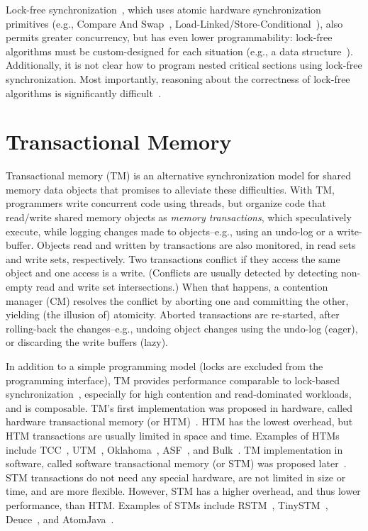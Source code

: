 \documentclass[12pt,english]{report}
\begin{document}
Lock-free synchronization~\cite{herlihy2008art}, 
which uses atomic hardware synchronization primitives (e.g., Compare And Swap~\cite{CAS64IA32, CASitanium}, Load-Linked/Store-Conditional~\cite{LL:CS:Sites:1993:AAA:151220.151226}),
also permits greater concurrency, but has even lower programmability: lock-free algorithms must be custom-designed for each situation (e.g., a data structure~\cite{lockfreeLLmichael2002high,lockfreeSL,lockfreeBSTfraser2004practical,HopscotchHashing,KarySearchTreesbrown2011non}). Additionally, it is not clear how to program nested critical sections using lock-free synchronization. Most importantly, reasoning about the correctness of lock-free algorithms is significantly difficult~\cite{herlihy2008art}. 

\section{Transactional Memory}

Transactional memory (TM) is an alternative synchronization model for shared memory data objects that promises to alleviate these difficulties.  With TM, programmers write concurrent code using threads, but organize code that read/write shared memory objects as \emph{memory transactions}, which speculatively execute, while logging changes made to objects--e.g., using an undo-log or a write-buffer. Objects read and written by transactions are also monitored, in read sets and write sets, respectively. Two transactions conflict if they access the same object and one access is a write. (Conflicts are usually detected by detecting non-empty read and write set intersections.) When that happens, a contention manager (CM) resolves the conflict by aborting one and committing the other, yielding (the illusion of) atomicity. Aborted transactions are re-started, after rolling-back the changes--e.g., undoing object changes using the undo-log (eager), or discarding the write buffers (lazy). 

In addition to a simple programming model (locks are excluded from the programming interface), TM provides performance comparable to lock-based synchronization~\cite{Saha:2006:MHP:1122971.1123001}, especially for high contention and read-dominated workloads, and is composable. TM's first implementation was proposed in hardware, called hardware transactional memory (or HTM)~\cite{Herlihy:1993:TMA:165123.165164}. HTM has the lowest overhead, but HTM transactions are usually limited in space and time. Examples of HTMs include TCC~\cite{ham04},
UTM~\cite{UTM1385954}, Oklahoma~\cite{Oklahoma260295}, ASF~\cite{AMDprocHTMchristie2010evaluation}, and Bulk~\cite{BulkCeze:2006:BDS:1135775.1136506}. TM implementation in software, called software transactional memory (or STM) was proposed later~\cite{sha95}. STM transactions do not need any special hardware, are not
limited in size or time, and are more flexible. However, STM has a higher overhead, and thus lower performance, than HTM. Examples of STMs include
RSTM~\cite{RSTM}, TinySTM~\cite{TinySTM}, Deuce~\cite{Deucekorland2010noninvasive},
and AtomJava~\cite{AtomJavahindman2006atomicity}.
\end{document}

